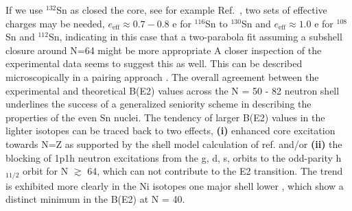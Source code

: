\documentclass[aps,prc,twocolumn,amssymb,showpacs]{revtex4}
\begin{document}
If we use  $^{132}$Sn as closed the core, see for example Ref.~\cite{hol98},
two sets of effective charges may be needed, $e_{\mathrm{eff}}\approx 0.7-0.8$ e
for $^{116}$Sn to $^{130}$Sn and $e_{\mathrm{eff}}\approx 1.0$ e
for $^{108}$Sn and $^{112}$Sn, indicating in this case that
a two-parabola fit assuming a
subshell closure around N=64 might be more appropriate
A closer inspection of the experimental data
seems to suggest this as well.
This can be described
microscopically in a pairing approach \cite{bes60}. 
The overall
agreement between the experimental and theoretical B(E2) values
across the N = 50 - 82 neutron shell underlines the success of a
generalized seniority scheme in describing the properties of the
even Sn nuclei. The tendency of larger B(E2) values in the lighter
isotopes can be traced back to two effects, \textbf{(i)} enhanced
core excitation towards N=Z as supported by the shell model
calculation of ref. \cite{gni05} and/or \textbf{(ii)} the blocking
of 1p1h neutron excitations from the g, d, s, orbits to the
odd-parity h$_{11/2}$ orbit for N $\gtrsim$ 64, which can not
contribute to the E2 transition. The trend is exhibited more
clearly in the Ni isotopes one major shell lower \cite{sor02},
which show a distinct minimum in the B(E2) at N = 40. %
\end{document}
